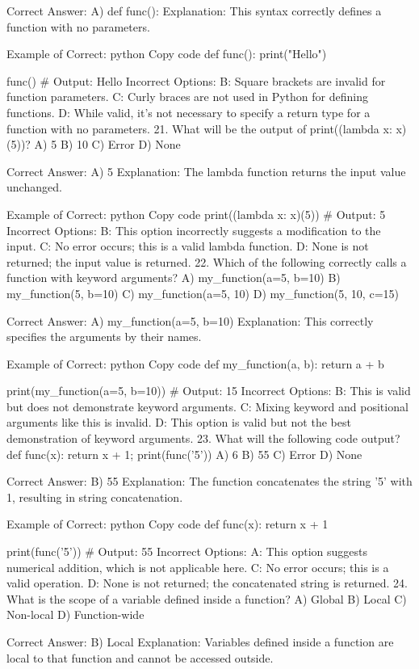 Correct Answer: A) def func():
Explanation: This syntax correctly defines a function with no parameters.

Example of Correct:
python
Copy code
def func():
    print("Hello")

func()  # Output: Hello
Incorrect Options:
B: Square brackets are invalid for function parameters.
C: Curly braces are not used in Python for defining functions.
D: While valid, it's not necessary to specify a return type for a function with no parameters.
21. What will be the output of print((lambda x: x)(5))?
A) 5
B) 10
C) Error
D) None

Correct Answer: A) 5
Explanation: The lambda function returns the input value unchanged.

Example of Correct:
python
Copy code
print((lambda x: x)(5))  # Output: 5
Incorrect Options:
B: This option incorrectly suggests a modification to the input.
C: No error occurs; this is a valid lambda function.
D: None is not returned; the input value is returned.
22. Which of the following correctly calls a function with keyword arguments?
A) my_function(a=5, b=10)
B) my_function(5, b=10)
C) my_function(a=5, 10)
D) my_function(5, 10, c=15)

Correct Answer: A) my_function(a=5, b=10)
Explanation: This correctly specifies the arguments by their names.

Example of Correct:
python
Copy code
def my_function(a, b):
    return a + b

print(my_function(a=5, b=10))  # Output: 15
Incorrect Options:
B: This is valid but does not demonstrate keyword arguments.
C: Mixing keyword and positional arguments like this is invalid.
D: This option is valid but not the best demonstration of keyword arguments.
23. What will the following code output? def func(x): return x + 1; print(func('5'))
A) 6
B) 55
C) Error
D) None

Correct Answer: B) 55
Explanation: The function concatenates the string '5' with 1, resulting in string concatenation.

Example of Correct:
python
Copy code
def func(x):
    return x + 1

print(func('5'))  # Output: 55
Incorrect Options:
A: This option suggests numerical addition, which is not applicable here.
C: No error occurs; this is a valid operation.
D: None is not returned; the concatenated string is returned.
24. What is the scope of a variable defined inside a function?
A) Global
B) Local
C) Non-local
D) Function-wide

Correct Answer: B) Local
Explanation: Variables defined inside a function are local to that function and cannot be accessed outside.


